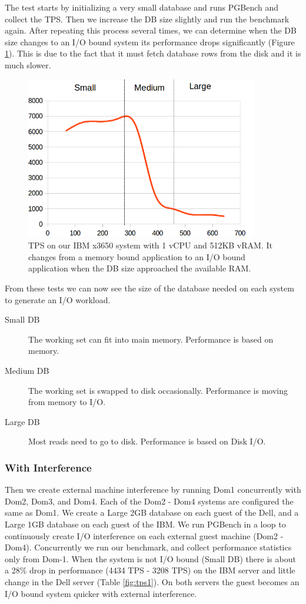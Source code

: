 The test starts by initializing a very small database and runs PGBench and collect the TPS.  
Then we increase the DB size slightly and run the benchmark again.  
After repeating this process several times, we can determine when the DB size changes to an I/O bound system its performance drops significantly (Figure \ref{smallIO}).  
This is due to the fact that it must fetch database rows from the disk and it is much slower.  

\begin{figure}[!h]
  \begin{center}
  \includegraphics[width=4in]{images/SmallScale.png}
  \caption{TPS on our IBM x3650 system with 1 vCPU and 512KB vRAM. It changes from a memory bound application to an I/O bound application when the DB size approached the available RAM.}
  \label{smallIO}
  \end{center}
\end{figure}

From these tests we can now see the size of the database needed on each system to generate an I/O workload. 
\begin{description}
  \item[Small DB] The working set can fit into main memory.  Performance is based on memory.
  \item[Medium DB] The working set is swapped to disk occasionally. Performance is moving from memory to I/O.
  \item[Large DB] Most reads need to go to disk.  Performance is based on Disk I/O.
\end{description}

\subsubsection{With Interference}
Then we create external machine interference by running Dom1 concurrently with Dom2, Dom3, and Dom4. Each of the Dom2 - Dom4 systems are configured the same as Dom1.  We create a Large 2GB database on each guest of the Dell, and a Large 1GB database on each guest of the IBM.  We run PGBench in a loop to continuously create I/O interference on each external guest machine (Dom2 - Dom4). Concurrently we run our benchmark, and collect performance statistics only from Dom-1.  When the system is not I/O bound (Small DB) there is about a 28\% drop in performance (4434 TPS - 3208 TPS) on the IBM server and little change in the Dell server (Table \ref{fig:tps1}).  On both servers the guest becomes an I/O bound system quicker with external interference.

